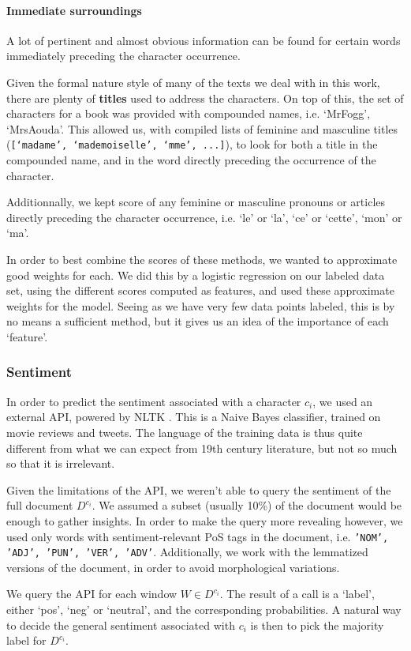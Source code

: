 \paragraph{Immediate surroundings} A lot of pertinent and almost obvious information can be found for certain words immediately preceding the character occurrence. 

Given the formal nature style of many of the texts we deal with in this work, there are plenty of \textbf{titles} used to address the characters. On top of this, the set of characters for a book was provided with compounded names, i.e. `MrFogg', `MrsAouda'. This allowed us, with compiled lists of feminine and masculine titles (\texttt{[`madame', `mademoiselle', `mme', ...]}), to look for both a title in the compounded name, and in the word directly preceding the occurrence of the character.

Additionnally, we kept score of any feminine or masculine pronouns or articles directly preceding the character occurrence, i.e. `le' or `la', `ce' or `cette', `mon' or `ma'. 

\vspace*{1em}

In order to best combine the scores of these methods, we wanted to approximate good weights for each. We did this by a logistic regression on our labeled data set, using the different scores computed as features, and used these approximate weights for the model. Seeing as we have very few data points labeled, this is by no means a sufficient method, but it gives us an idea of the importance of each `feature'.

\subsubsection{Sentiment} 
In order to predict the sentiment associated with a character $c_i$, we used an external API, powered by NLTK \cite{perkins2010textclass}. This is a Naive Bayes classifier, trained on movie reviews and tweets. The language of the training data is thus quite different from what we can expect from 19th century literature, but not so much so that it is irrelevant.

Given the limitations of the API, we weren't able to query the sentiment of the full document $D^{c_i}$. We assumed a subset (usually 10\%) of the document would be enough to gather insights. In order to make the query more revealing however, we used only words with sentiment-relevant PoS tags in the document, i.e. \texttt{'NOM', 'ADJ', 'PUN', 'VER', 'ADV'}. Additionally, we work with the lemmatized versions of the document, in order to avoid morphological variations.

We query the API for each window $W \in D^{c_i}$. The result of a call is a `label', either `pos', `neg' or `neutral', and the corresponding probabilities. A natural way to decide the general sentiment associated with $c_i$ is then to pick the majority label for $D^{c_i}$.